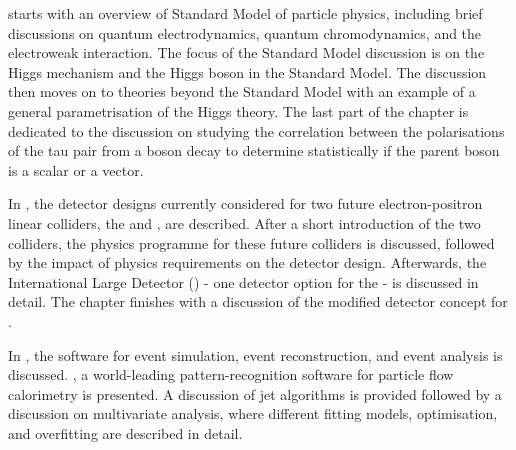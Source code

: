 
 starts with an overview of Standard Model of particle physics, including brief discussions on quantum electrodynamics, quantum chromodynamics, and the electroweak interaction. The focus of the Standard Model discussion is on the  Higgs mechanism and the Higgs boson in the Standard Model. The discussion then moves on to theories beyond the Standard Model with an example of   a general parametrisation of the Higgs theory. The last part of the chapter is dedicated to the discussion on studying the correlation between the polarisations of the  tau pair from a boson decay to determine statistically if the parent boson is a  scalar or a vector.



In , the detector designs currently considered for two future electron-positron linear colliders, the \ILC and \CLIC, are described. After a short introduction of the two colliders, the physics programme for these future colliders is discussed, followed by the impact of physics requirements on the detector design. Afterwards, the International Large Detector (\ILD) - one detector option for the \ILC - is discussed in detail. The chapter finishes with a discussion of the modified \ILD detector concept for \CLIC.

In , the software for event simulation, event reconstruction, and event analysis is  discussed.  \pandora, a world-leading pattern-recognition software for particle flow calorimetry is presented. A discussion of jet algorithms is provided followed by a discussion on  multivariate analysis, where different fitting models, optimisation, and overfitting are described in detail.




